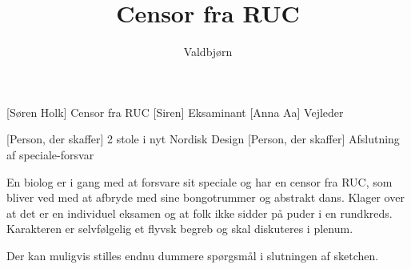 \documentclass[a4paper,11pt]{article}
\title{Censor fra RUC}
\author{Valdbjørn}
\begin{document}
\maketitle

\begin{roles}
    [Søren Holk] Censor fra RUC
    [Siren] Eksaminant
    [Anna Aa] Vejleder
\end{roles}

\begin{props}
    [Person, der skaffer] 2 stole i nyt Nordisk Design
    [Person, der skaffer] Afslutning af speciale-forsvar
\end{props}


\begin{sketch}

En biolog er i gang med at forsvare sit speciale og har en censor fra RUC, som bliver ved med at afbryde med sine bongotrummer og abstrakt dans. Klager over at det er en individuel eksamen og at folk ikke sidder på puder i en rundkreds.
Karakteren er selvfølgelig et flyvsk begreb og skal diskuteres i plenum.

Der kan muligvis stilles endnu dummere spørgsmål i slutningen af sketchen.


\end{sketch}
\end{document}
